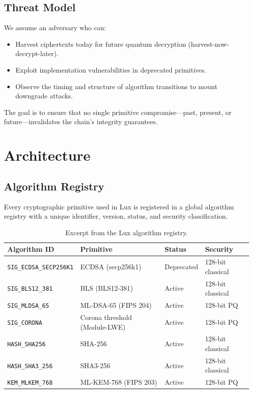 \documentclass[11pt]{article}
\begin{document}
\subsection{Threat Model}

We assume an adversary who can:
\begin{itemize}
\item Harvest ciphertexts today for future quantum decryption (harvest-now-decrypt-later).
\item Exploit implementation vulnerabilities in deprecated primitives.
\item Observe the timing and structure of algorithm transitions to mount downgrade attacks.
\end{itemize}

The goal is to ensure that no single primitive compromise---past, present, or future---invalidates the chain's integrity guarantees.

\section{Architecture}

\subsection{Algorithm Registry}

Every cryptographic primitive used in Lux is registered in a global algorithm registry with a unique identifier, version, status, and security classification.

\begin{table}[h]
\centering
\small
\begin{tabular}{@{}llll@{}}
\toprule
\textbf{Algorithm ID} & \textbf{Primitive} & \textbf{Status} & \textbf{Security} \\
\midrule
\texttt{SIG\_ECDSA\_SECP256K1} & ECDSA (secp256k1) & Deprecated & 128-bit classical \\
\texttt{SIG\_BLS12\_381} & BLS (BLS12-381) & Active & 128-bit classical \\
\texttt{SIG\_MLDSA\_65} & ML-DSA-65 (FIPS 204) & Active & 128-bit PQ \\
\texttt{SIG\_CORONA} & Corona threshold (Module-LWE) & Active & 128-bit PQ \\
\texttt{HASH\_SHA256} & SHA-256 & Active & 128-bit classical \\
\texttt{HASH\_SHA3\_256} & SHA3-256 & Active & 128-bit classical \\
\texttt{KEM\_MLKEM\_768} & ML-KEM-768 (FIPS 203) & Active & 128-bit PQ \\
\bottomrule
\end{tabular}
\caption{Excerpt from the Lux algorithm registry.}
\label{tab:registry}
\end{table}
\end{document}
